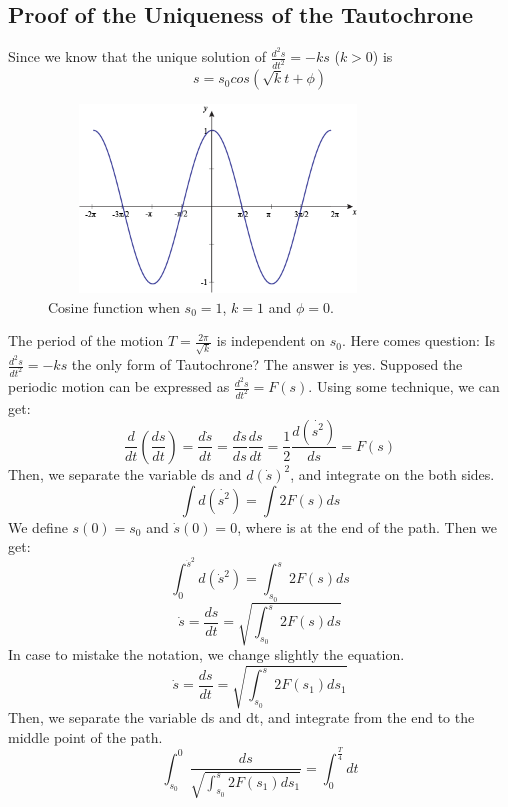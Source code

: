 \documentclass[12pt,a4paper]{article}
\begin{document}
\subsection{Proof of the Uniqueness of the Tautochrone}
Since we know that the unique solution of $\frac{d^2s}{dt^2}=-ks$ ($k>0$) is 
\begin{equation}
s=s_0cos(\sqrt{k}t+\phi)
\end{equation}
\begin{figure}[H]

\centering
\includegraphics[width=9cm,height=5cm]{cos.png}
\caption{Cosine function when $s_{0}=1$, $k=1$ and $\phi=0$.}
\end{figure} 

The period of the motion $T=\frac{2\pi}{\sqrt{k}}$ is independent on $s_0$.
Here comes question: Is $\frac{d^2s}{dt^2}=-ks$ the only form of Tautochrone? The answer is yes.
Supposed the periodic motion can be expressed as $\frac{d^2s}{dt^2}=F(s)$.
Using some technique, we can get:
$$\frac{d}{dt}(\frac{ds}{dt})=\frac{d\dot s}{dt}=\frac{d\dot s}{ds}\frac{ds}{dt}=\frac{1}{2}\frac{d(\dot{ s^2})}{ds}=F(s)$$
Then, we separate the variable ds and $d(\dot s)^2$, and integrate on the both sides.
$$\int d(\dot {s^2})=\int 2F(s)ds$$
We define $s(0)=s_0$ and $\dot s(0)=0$, where is at the end of the path.
Then we get:
$$\int_{0}^{\dot s^2} d(\dot s^2)=\int_{s_0}^{s} 2F(s)ds$$
$$\dot s=\frac{ds}{dt}=\sqrt{\int_{s_0}^{s} 2F(s)ds}$$
In case to mistake the notation, we change slightly the equation.
$$\dot s=\frac{ds}{dt}=\sqrt{\int_{s_0}^{s} 2F(s_1)ds_1}$$
Then, we separate the variable ds and dt, and  integrate from the end to the middle point of the path.
$$\int_{s_0}^{0} \frac{ds}{\sqrt{\int_{s_0}^{s} 2F(s_1)ds_1}}=\int_0^{\frac{T}{4}} dt$$
\end{document}

